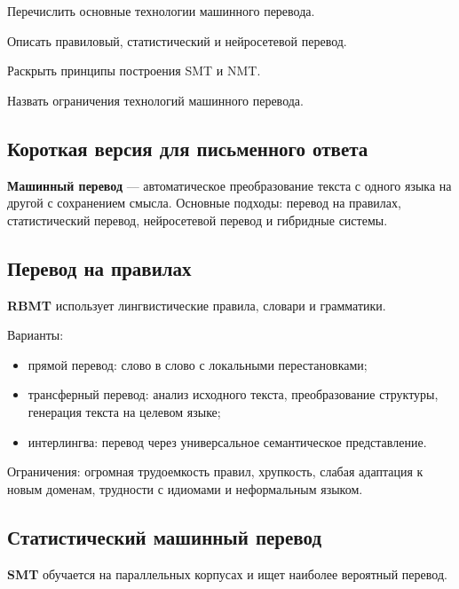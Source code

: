 
\begin{examplan}
    \item Перечислить основные технологии машинного перевода.
    \item Описать правиловый, статистический и нейросетевой перевод.
    \item Раскрыть принципы построения SMT и NMT.
    \item Назвать ограничения технологий машинного перевода.
\end{examplan}

\subsection*{Короткая версия для письменного ответа}

\textbf{Машинный перевод} --- автоматическое преобразование текста с одного языка на другой с сохранением смысла. Основные подходы: перевод на правилах, статистический перевод, нейросетевой перевод и гибридные системы.

\subsection*{Перевод на правилах}

\textbf{RBMT} использует лингвистические правила, словари и грамматики.

Варианты:
\begin{itemize}
    \item прямой перевод: слово в слово с локальными перестановками;
    \item трансферный перевод: анализ исходного текста, преобразование структуры, генерация текста на целевом языке;
    \item интерлингва: перевод через универсальное семантическое представление.
\end{itemize}

Ограничения: огромная трудоемкость правил, хрупкость, слабая адаптация к новым доменам, трудности с идиомами и неформальным языком.

\subsection*{Статистический машинный перевод}

\textbf{SMT} обучается на параллельных корпусах и ищет наиболее вероятный перевод.

